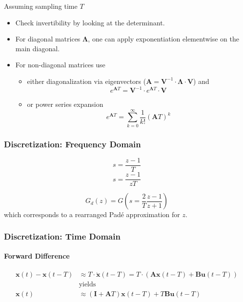 Assuming sampling time $T$
\begin{itemize}
    \item Check invertibility by looking at the determinant.
    \item For diagonal matrices $\boldsymbol{\Lambda}$, one can apply exponentiation elementwise on the main diagonal.
    \item For non-diagonal matrices use
          \begin{itemize}
              \item either diagonalization via eigenvectors ($\mathbf{A}=\mathbf{V}^{-1}\cdot \boldsymbol{\Lambda} \cdot \mathbf{V}$) and
                    \begin{equation*}
                        e^{\mathbf{A}T} = \mathbf{V}^{-1}\cdot e^{\boldsymbol{\Lambda} T} \cdot \mathbf{V}
                    \end{equation*}
              \item or power series expansion
                    \begin{equation*}
                        e^{\mathbf{A}T}=\sum_{k=0}^{\infty}\frac{1}{k!}{\left(\mathbf{A}T\right)}^k
                    \end{equation*}
          \end{itemize}
\end{itemize}

\subsubsection{Discretization: Frequency Domain}\label{disc::tustin}
\noindent\begin{equation*}
    s = \frac{z-1}{T}
\end{equation*}
\noindent\begin{equation*}
    s = \frac{z-1}{zT}
\end{equation*}

\begin{equation*}
    G_{d}(z)=G\left(s=\frac2T\frac{z-1}{z+1}\right)
\end{equation*}
which corresponds to a rearranged Padé approximation for $z$.

\subsubsection{Discretization: Time Domain}

\paragraph{Forward Difference}
\noindent\begin{align*}
    \mathbf{x}(t)-\mathbf{x}(t-T) & \approx T\cdot\dot{\mathbf{x}}(t-T) =T\cdot(\mathbf{Ax}(t-T)+\mathbf{Bu}(t-T)) \\
                                  & \text{yields}                                                                  \\
    \mathbf{x}(t)                 & \approx(\mathbf{I}+\mathbf{A}T)\mathbf{x}(t-T)+T\mathbf{Bu}(t-T)
\end{align*}


